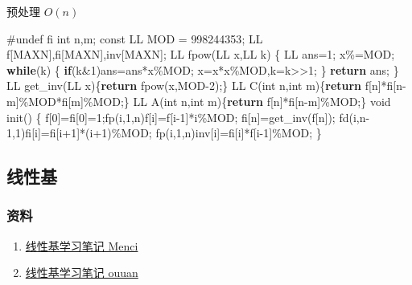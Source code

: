 \documentclass[
]{article}
\newenvironment{Shaded}{}{}
\newcommand{\AttributeTok}[1]{\textcolor[rgb]{0.49,0.56,0.16}{#1}}
\newcommand{\ControlFlowTok}[1]{\textcolor[rgb]{0.00,0.44,0.13}{\textbf{#1}}}
\newcommand{\DataTypeTok}[1]{\textcolor[rgb]{0.56,0.13,0.00}{#1}}
\newcommand{\DecValTok}[1]{\textcolor[rgb]{0.25,0.63,0.44}{#1}}
\newcommand{\NormalTok}[1]{#1}
\newcommand{\PreprocessorTok}[1]{\textcolor[rgb]{0.74,0.48,0.00}{#1}}
\providecommand{\tightlist}{%
  \setlength{\itemsep}{0pt}\setlength{\parskip}{0pt}}
\begin{document}
预处理 \(O(n)\)

\begin{Shaded}
\begin{Highlighting}[]
\PreprocessorTok{\#undef fi}
\DataTypeTok{int}\NormalTok{ n,m;}
\AttributeTok{const}\NormalTok{ LL MOD = }\DecValTok{998244353}\NormalTok{;}
\NormalTok{LL f[MAXN],fi[MAXN],inv[MAXN];}
\NormalTok{LL fpow(LL x,LL k)}
\NormalTok{\{}
\NormalTok{    LL ans=}\DecValTok{1}\NormalTok{; x\%=MOD;}
    \ControlFlowTok{while}\NormalTok{(k)}
\NormalTok{    \{}
        \ControlFlowTok{if}\NormalTok{(k\&}\DecValTok{1}\NormalTok{)ans=ans*x\%MOD;}
\NormalTok{        x=x*x\%MOD,k=k\textgreater{}\textgreater{}}\DecValTok{1}\NormalTok{;}
\NormalTok{    \}}
    \ControlFlowTok{return}\NormalTok{ ans;}
\NormalTok{\}}
\NormalTok{LL get\_inv(LL x)\{}\ControlFlowTok{return}\NormalTok{ fpow(x,MOD{-}}\DecValTok{2}\NormalTok{);\}}
\NormalTok{LL C(}\DataTypeTok{int}\NormalTok{ n,}\DataTypeTok{int}\NormalTok{ m)\{}\ControlFlowTok{return}\NormalTok{ f[n]*fi[n{-}m]\%MOD*fi[m]\%MOD;\}}
\NormalTok{LL A(}\DataTypeTok{int}\NormalTok{ n,}\DataTypeTok{int}\NormalTok{ m)\{}\ControlFlowTok{return}\NormalTok{ f[n]*fi[n{-}m]\%MOD;\}}
\DataTypeTok{void}\NormalTok{ init()}
\NormalTok{\{}
\NormalTok{    f[}\DecValTok{0}\NormalTok{]=fi[}\DecValTok{0}\NormalTok{]=}\DecValTok{1}\NormalTok{;fp(i,}\DecValTok{1}\NormalTok{,n)f[i]=f[i{-}}\DecValTok{1}\NormalTok{]*i\%MOD;}
\NormalTok{    fi[n]=get\_inv(f[n]);}
\NormalTok{    fd(i,n{-}}\DecValTok{1}\NormalTok{,}\DecValTok{1}\NormalTok{)fi[i]=fi[i+}\DecValTok{1}\NormalTok{]*(i+}\DecValTok{1}\NormalTok{)\%MOD;}
\NormalTok{    fp(i,}\DecValTok{1}\NormalTok{,n)inv[i]=fi[i]*f[i{-}}\DecValTok{1}\NormalTok{]\%MOD;}
\NormalTok{\}}
\end{Highlighting}
\end{Shaded}

\hypertarget{ux7ebfux6027ux57fa}{%
\subsection{线性基}\label{ux7ebfux6027ux57fa}}

\hypertarget{ux8d44ux6599-7}{%
\subsubsection{资料}\label{ux8d44ux6599-7}}

\begin{enumerate}
\def\labelenumi{\arabic{enumi}.}
\tightlist
\item
  \href{https://oi.men.ci/linear-basis-notes/}{线性基学习笔记 Menci}
\item
  \href{https://ouuan.github.io/\%E7\%BA\%BF\%E6\%80\%A7\%E5\%9F\%BA\%E5\%AD\%A6\%E4\%B9\%A0\%E7\%AC\%94\%E8\%AE\%B0/}{线性基学习笔记
  ouuan}
\end{enumerate}
\end{document}
